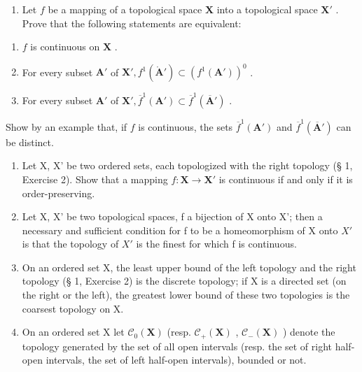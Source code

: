 \BourbakiExerciseGroup

\begin{enumerate}
\def\labelenumi{\arabic{enumi})}
\tightlist
\item
  Let \(f\) be a mapping of a topological space \(\mathbf{X}\) into a topological space \(\mathbf{X}'\) . Prove that the following statements are equivalent:
\end{enumerate}

\begin{enumerate}
\def\labelenumi{\alph{enumi})}
\item
  \(f\) is continuous on \(\mathbf{X}\) .
\item
  For every subset \(\mathbf{A}'\) of \(\mathbf{X}', f^1 (\mathring{\mathbf{A}}') \subset (f^1 (\mathbf{A}'))^0\) .
\item
  For every subset \(\mathbf{A}'\) of \(\mathbf{X}', \overline{f}^1 (\mathbf{A}') \subset \overline{f}^1 (\overline{\mathbf{A}}')\) .
\end{enumerate}

Show by an example that, if \(f\) is continuous, the sets \(\overline{f}^1 (\mathbf{A}')\) and \(\overline{f}^1 (\overline{\mathbf{A}}')\) can be distinct.

\begin{enumerate}
\def\labelenumi{\arabic{enumi})}
\setcounter{enumi}{1}
\item
  Let X, X' be two ordered sets, each topologized with the right topology (§ 1, Exercise 2). Show that a mapping \(f: \mathbf{X} \to \mathbf{X}'\) is continuous if and only if it is order-preserving.
\item
  Let X, X' be two topological spaces, f a bijection of X onto X'; then a necessary and sufficient condition for f to be a homeomorphism of X onto \(X'\) is that the topology of \(X'\) is the finest for which f is continuous.
\item
  On an ordered set X, the least upper bound of the left topology and the right topology (§ 1, Exercise 2) is the discrete topology; if X is a directed set (on the right or the left), the greatest lower bound of these two topologies is the coarsest topology on X.
\item
  On an ordered set X let \(\mathcal{C}_{0}(\mathbf{X})\) (resp. \(\mathcal{C}_{+}(\mathbf{X})\) , \(\mathcal{C}_{-}(\mathbf{X})\) ) denote the topology generated by the set of all open intervals (resp. the set of right half-open intervals, the set of left half-open intervals), bounded or not.
\end{enumerate}

